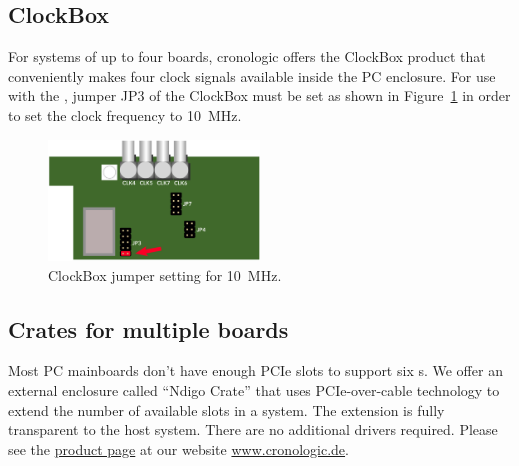 {        \subsection{ClockBox}
            For systems of up to four boards, cronologic offers the ClockBox
            product that conveniently makes four clock signals available
            inside the PC enclosure. For use with the \deviceName, jumper JP3
            of the ClockBox must be set as shown in Figure~\ref{fig:clockbox}
            in order to set the clock frequency to \SI{10}{\mega\hertz}. 
            \begin{figure}[ht]
                \begin{center}
                    \includegraphics[width=0.5\textwidth]{
                        xhptdc/figures/clockbox.pdf}				
                    \caption{ClockBox jumper setting for
                        \SI{10}{\mega\hertz}.\label{fig:clockbox}}
                \end{center} 
            \end{figure}
        
        \subsection{Crates for multiple boards}
            Most PC mainboards don't have enough PCIe slots to support six
            \deviceName s.  We offer an external enclosure called ``Ndigo
            Crate'' that uses PCIe-over-cable technology to extend the number
            of available slots in a system.  The extension is fully
            transparent to the host system. There are no additional drivers
            required.  Please see the
            \href{https://www.cronologic.de/products/pcie/pcie-crates}{%
                product page} at our website \url{www.cronologic.de}.
}{}




    


